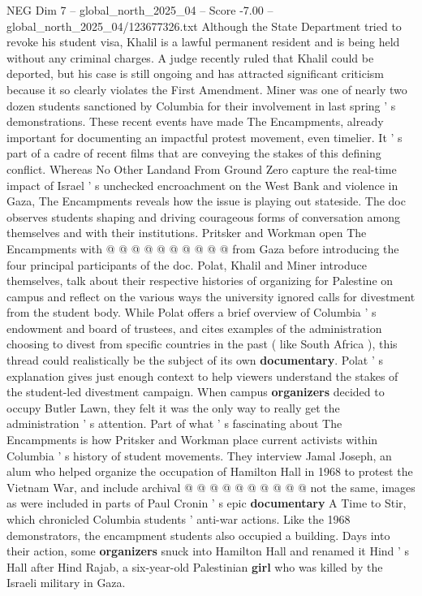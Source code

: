 \begin{textsample}{NEG Dim 7 – global\_north\_2025\_04 – Score -7.00 – global\_north\_2025\_04/123677326.txt}
Although the State Department tried to revoke his student visa, Khalil is a lawful permanent resident and is being held without any criminal charges.
A judge recently ruled that Khalil could be deported, but his case is still ongoing and has attracted significant criticism because it so clearly violates the First Amendment.
Miner was one of nearly two dozen students sanctioned by Columbia for their involvement in last spring ' s demonstrations.
These recent events have made The Encampments, already important for documenting an impactful protest movement, even timelier.
It ' s part of a cadre of recent films that are conveying the stakes of this defining conflict.
Whereas No Other Landand From Ground Zero capture the real-time impact of Israel ' s unchecked encroachment on the West Bank and violence in Gaza, The Encampments reveals how the issue is playing out stateside.
The doc observes students shaping and driving courageous forms of conversation among themselves and with their institutions.
Pritsker and Workman open The Encampments with @ @ @ @ @ @ @ @ @ @ from Gaza before introducing the four principal participants of the doc.
Polat, Khalil and Miner introduce themselves, talk about their respective histories of organizing for Palestine on campus and reflect on the various ways the university ignored calls for divestment from the student body.
While Polat offers a brief overview of Columbia ' s endowment and board of trustees, and cites examples of the administration choosing to divest from specific countries in the past ( like South Africa ), this thread could realistically be the subject of its own \textbf{documentary}.
Polat ' s explanation gives just enough context to help viewers understand the stakes of the student-led divestment campaign.
When campus \textbf{organizers} decided to occupy Butler Lawn, they felt it was the only way to really get the administration ' s attention.
Part of what ' s fascinating about The Encampments is how Pritsker and Workman place current activists within Columbia ' s history of student movements.
They interview Jamal Joseph, an alum who helped organize the occupation of Hamilton Hall in 1968 to protest the Vietnam War, and include archival @ @ @ @ @ @ @ @ @ @ not the same, images as were included in parts of Paul Cronin ' s epic \textbf{documentary} A Time to Stir, which chronicled Columbia students ' anti-war actions.
Like the 1968 demonstrators, the encampment students also occupied a building.
Days into their action, some \textbf{organizers} snuck into Hamilton Hall and renamed it Hind ' s Hall after Hind Rajab, a six-year-old Palestinian \textbf{girl} who was killed by the Israeli military in Gaza.

\end{textsample}
